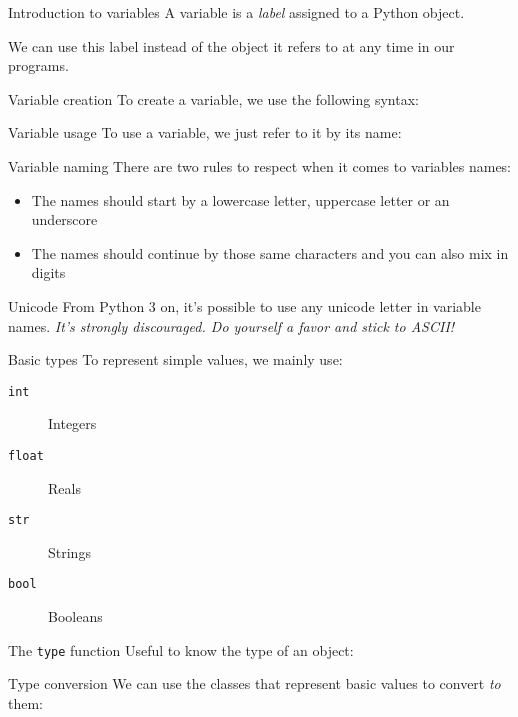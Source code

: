 \begin{frame}{Introduction to variables}
  A variable is a \emph{label} assigned to a Python object.

  We can use this label instead of the object it refers to at any time in our programs.
\end{frame}

\begin{frame}{Variable creation}
  To create a variable, we use the following syntax:
\end{frame}

\begin{frame}{Variable usage}
  To use a variable, we just refer to it by its name:
\end{frame}

\begin{frame}{Variable naming}
  There are two rules to respect when it comes to variables names:

  \begin{itemize}
    \item The names should start by a lowercase letter, uppercase letter or an underscore
    \item The names should continue by those same characters and you can also mix in digits
  \end{itemize}

  \begin{alertblock}{Unicode}
    From Python 3 on, it's possible to use any unicode letter in variable names. \emph{It's strongly discouraged. Do yourself a favor and stick to ASCII!}
  \end{alertblock}
\end{frame}

\begin{frame}{Basic types}
  To represent simple values, we mainly use:

  \begin{description}
    \item[\texttt{int}] Integers
    \item[\texttt{float}] Reals
    \item[\texttt{str}] Strings
    \item[\texttt{bool}] Booleans
  \end{description}
\end{frame}

\begin{frame}{The \texttt{type} function}
  Useful to know the type of an object:

\end{frame}

\begin{frame}{Type conversion}
  We can use the classes that represent basic values to convert \emph{to} them:

\end{frame}
